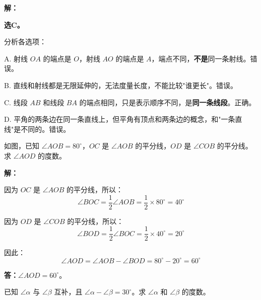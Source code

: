 \documentclass[12pt, a4paper]{ctexart}
\begin{document}
\textbf{解：}

\textbf{选C。}

分析各选项：

A. 射线 $OA$ 的端点是 $O$，射线 $AO$ 的端点是 $A$，端点不同，\textbf{不是}同一条射线。错误。

B. 直线和射线都是无限延伸的，无法度量长度，不能比较"谁更长"。错误。

C. 线段 $AB$ 和线段 $BA$ 的端点相同，只是表示顺序不同，是\textbf{同一条线段}。正确。

D. 平角的两条边在同一条直线上，但平角有顶点和两条边的概念，和"一条直线"是不同的。错误。

\vspace{6pt}

\begin{examplebox}[【例题4】综合：角平分线与角度计算]
如图，已知 $\angle AOB=80^\circ$，$OC$ 是 $\angle AOB$ 的平分线，$OD$ 是 $\angle COB$ 的平分线。求 $\angle AOD$ 的度数。

\begin{center}
\end{center}
\end{examplebox}

\textbf{解：}

因为 $OC$ 是 $\angle AOB$ 的平分线，所以：
$$\angle BOC=\frac{1}{2}\angle AOB=\frac{1}{2}\times 80^\circ=40^\circ$$

因为 $OD$ 是 $\angle COB$ 的平分线，所以：
$$\angle BOD=\frac{1}{2}\angle BOC=\frac{1}{2}\times 40^\circ=20^\circ$$

因此：
$$\angle AOD=\angle AOB-\angle BOD=80^\circ-20^\circ=60^\circ$$

\textbf{答：}$\angle AOD=60^\circ$。

\vspace{6pt}

\begin{examplebox}[【例题5】综合：互余与互补的应用]
已知 $\angle\alpha$ 与 $\angle\beta$ 互补，且 $\angle\alpha-\angle\beta=30^\circ$。求 $\angle\alpha$ 和 $\angle\beta$ 的度数。
\end{examplebox}
\end{document}

